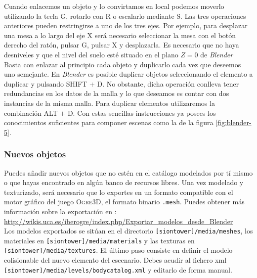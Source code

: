 Cuando enlacemos un objeto y lo convirtamos en local podemos moverlo utilizando
la tecla G, rotarlo con R o escalarlo mediante S. Las tres operaciones anteriores
pueden restringirse a uno de los tres ejes. Por ejemplo, para desplazar
una mesa a lo largo del eje X será necesario seleccionar la mesa con el botón
derecho del ratón, pulsar G, pulsar X y desplazarla. Es necesario que
no haya desniveles y que el nivel del suelo esté situado en el plano $Z = 0$
de \textit{Blender}\\

Basta con enlazar al principio cada objeto y duplicarlo cada vez que deseemos
uno semejante. En \textit{Blender} es posible duplicar objetos seleccionando
el elemento a duplicar y pulsando SHIFT $+$ D. No obstante, dicha operación
conlleva tener redundancias en los datos de la malla y lo que deseamos es
contar con dos instancias de la misma malla. Para duplicar elementos
utilizaremos la combinación ALT $+$ D. Con estas sencillas instrucciones
ya posees los conocimientos suficientes para componer escenas como la de
la figura \ref{fig:blender-5}.


\subsubsection*{Nuevos objetos}

Puedes añadir nuevos objetos que no estén en el catálogo modelados por tí
mismo o que hayas encontrado en algún banco de recursos libres. Una vez
modelado y texturizado, será necesario que lo exportes en un formato compatible
con el motor gráfico del juego \textsc{Ogre3D}, el formato binario \texttt{.mesh}.
Puedes obtener más información sobre la exportación en \wiki:\\

\url{http://wikis.uca.es/iberogre/index.php/Exportar_modelos_desde_Blender}\\

Los modelos exportados se sitúan en el directorio \texttt{[siontower]/media/meshes},
los materiales en \texttt{[siontower]/media/materials} y las texturas
en \texttt{[siontower]/media/textures}. El último paso consiste en definir
el modelo colisionable del nuevo elemento del escenario. Debes acudir al
fichero xml \texttt{[siontower]/media/levels/bodycatalog.xml} y editarlo
de forma manual.\\

